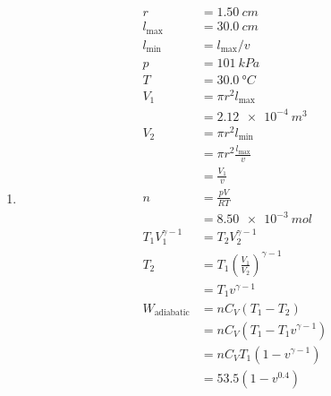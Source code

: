 \documentclass{article}
\begin{document}
\begin{enumerate}
  \item

        \begin{align*}
          r                    & = \qty{1.50}{cm}                                  \\
          l_\text{max}         & = \qty{30.0}{cm}                                  \\
          l_\text{min}         & = l_\text{max} / v                                \\
          p                    & = \qty{101}{kPa}                                  \\
          T                    & = \qty{30.0}{\degree C}                           \\
          V_1                  & = \pi r^2 l_\text{max}                            \\
                               & = \qty{2.12e-4}{m^3}                              \\
          V_2                  & = \pi r^2 l_\text{min}                            \\
                               & = \pi r^2 \frac{l_\text{max}}{v}                  \\
                               & = \frac{V_1}{v}                                   \\
          n                    & = \frac{p V}{R T}                                 \\
                               & = \qty{8.50e-3}{mol}                              \\
          T_1 V_1^{\gamma - 1} & = T_2 V_2^{\gamma - 1}                            \\
          T_2                  & = T_1 \left( \frac{V_1}{V_2} \right)^{\gamma - 1} \\
                               & = T_1 v^{\gamma - 1}                              \\
          W_\text{adiabatic}   & = n C_V (T_1 - T_2)                               \\
                               & = n C_V (T_1 - T_1 v^{\gamma - 1})                \\
                               & = n C_V T_1 (1 - v^{\gamma - 1})                  \\
                               & = 53.5 (1 - v^{0.4})                              \\

\end{align*}
\end{enumerate}
\end{document}
